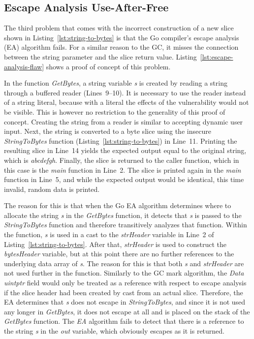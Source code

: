 
\subsection{Escape Analysis Use-After-Free}\label{subsec:unsafe-security-problems:slice-casts:escape-analysis}

The third problem that comes with the incorrect construction of a new slice shown in Listing~\ref{lst:string-to-bytes}
is that the Go compiler's escape analysis (\acrshort{EA}) algorithm fails.
For a similar reason to the \acrshort{GC}, it misses the connection between the string parameter and the slice return
value.
Listing~\ref{lst:escape-analysis-flaw} shows a proof of concept of this problem.



In the function \textit{GetBytes}, a string variable \textit{s} is created by reading a string through a buffered
reader (Lines~9--10).
It is necessary to use the reader instead of a string literal, because with a literal the effects of the vulnerability
would not be visible.
This is however no restriction to the generality of this proof of concept.
Creating the string from a reader is similar to accepting dynamic user input.
Next, the string is converted to a byte slice using the insecure \textit{StringToBytes} function
(Listing~\ref{lst:string-to-bytes}) in Line~11.
Printing the resulting slice in Line~14 yields the expected output equal to the original string, which is
\textit{abcdefgh}.
Finally, the slice is returned to the caller function, which in this case is the \textit{main} function in Line~2.
The slice is printed again in the \textit{main} function in Line~5, and while the expected output would be identical,
this time invalid, random data is printed.

The reason for this is that when the Go \acrshort{EA} algorithm determines where to allocate the string \textit{s} in
the \textit{GetBytes} function, it detects that \textit{s} is passed to the \textit{StringToBytes} function and
therefore transitively analyzes that function.
Within the function, \textit{s} is used in a cast to the \textit{strHeader} variable in Line~2 of
Listing~\ref{lst:string-to-bytes}.
After that, \textit{strHeader} is used to construct the \textit{bytesHeader} variable, but at this point there are no
further references to the underlying data array of \textit{s}.
The reason for this is that both \textit{s} and \textit{strHeader} are not used further in the function.
Similarly to the \acrshort{GC} mark algorithm, the \textit{Data uintptr} field would only be treated as a reference with
respect to escape analysis if the slice header had been created by cast from an actual slice.
Therefore, the \acrshort{EA} determines that \textit{s} does not escape in \textit{StringToBytes}, and since it is not
used any longer in \textit{GetBytes}, it does not escape at all and is placed on the stack of the \textit{GetBytes}
function.
The \textit{EA} algorithm fails to detect that there is a reference to the string \textit{s} in the \textit{out}
variable, which obviously escapes as it is returned.

